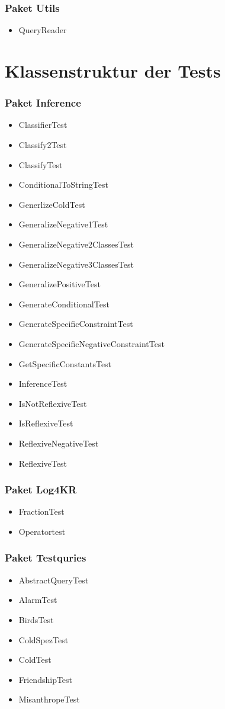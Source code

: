 \documentclass[a4paper, 11pt]{book}
\begin{document}
{\subsubsection{Paket Utils}
\begin{itemize}
	\item QueryReader
\end{itemize}
\section{Klassenstruktur der Tests}
\subsubsection{Paket Inference}
\begin{itemize}
	\item ClassifierTest
	\item Classify2Test
	\item ClassifyTest
	\item ConditionalToStringTest
	\item GenerlizeColdTest
	\item GeneralizeNegative1Test
	\item GeneralizeNegative2ClassesTest
	\item GeneralizeNegative3ClassesTest
	\item GeneralizePositiveTest
	\item GenerateConditionalTest
	\item GenerateSpecificConstraintTest
	\item GenerateSpecificNegativeConstraintTest
	\item GetSpecificConstantsTest
	\item InferenceTest
	\item IsNotReflexiveTest
	\item IsReflexiveTest
	\item ReflexiveNegativeTest
	\item ReflexiveTest
\end{itemize}
\subsubsection{Paket Log4KR}
\begin{itemize}
	\item FractionTest
	\item Operatortest
\end{itemize}
\subsubsection{Paket Testquries}
\begin{itemize}
	\item AbstractQueryTest
	\item AlarmTest
	\item BirdsTest
	\item ColdSpezTest
	\item ColdTest
	\item FriendshipTest
	\item MisanthropeTest
	

\end{itemize}}
\end{document}
